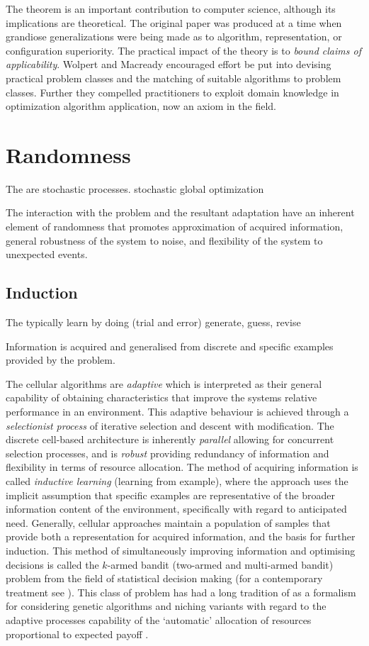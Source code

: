\documentclass[a4paper, 11pt]{article}
\begin{document}
The theorem is an important contribution to computer science, although its implications are theoretical. The original paper was produced at a time when grandiose generalizations were being made as to algorithm, representation, or configuration superiority. The practical impact of the theory is to \emph{bound claims of applicability}. Wolpert and Macready encouraged effort be put into devising practical problem classes and the matching of suitable algorithms to problem classes. Further they compelled practitioners to exploit domain knowledge in optimization algorithm application, now an axiom in the field.


% 
% 
\section{Randomness}
The are stochastic processes.
stochastic global optimization

The interaction with the problem and the resultant adaptation have an inherent element of randomness that promotes approximation of acquired information, general robustness of the system to noise, and flexibility of the system to unexpected events. 


% 
% 
\subsection{Induction}
The typically learn by doing (trial and error)
generate, guess, revise

Information is acquired and generalised from discrete and specific examples provided by the problem.

The cellular algorithms are \emph{adaptive} which is interpreted as their general capability of obtaining characteristics that improve the systems relative performance in an environment. This adaptive behaviour is achieved through a \emph{selectionist process} of iterative selection and descent with modification. The discrete cell-based architecture is inherently \emph{parallel} allowing for concurrent selection processes, and is \emph{robust} providing redundancy of information and flexibility in terms of resource allocation. The method of acquiring information is called \emph{inductive learning} (learning from example), where the approach uses the implicit assumption that specific examples are representative of the broader information content of the environment, specifically with regard to anticipated need. Generally, cellular approaches maintain a population of samples that provide both a representation for acquired information, and the basis for further induction.
This method of simultaneously improving information and optimising decisions is called the $k$-armed bandit (two-armed and multi-armed bandit) problem from the field of statistical decision making \cite{Robbins1952} (for a contemporary treatment see \cite{Bergemann2006}). This class of problem has had a long tradition of as a formalism for considering genetic algorithms and niching variants with regard to the adaptive processes capability of the `automatic' allocation of resources proportional to expected payoff \cite{Goldberg1989a}.
\end{document}
